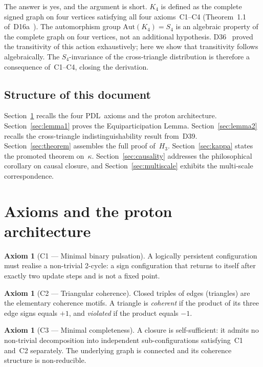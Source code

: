 \documentclass[11pt,a4paper]{article}
\theoremstyle{plain}
\theoremstyle{definition}
\newtheorem{axiom}[theorem]{Axiom}
\theoremstyle{remark}
\newcommand{\PDL}{\textnormal{PDL}}
\newcommand{\Kfour}{K_4}
\newcommand{\kap}{\kappa}
\begin{document}
The answer is yes, and the argument is short. $\Kfour$ is defined as the complete signed graph on four vertices satisfying all four axioms~C1--C4 (Theorem~1.1 of~D16a~\cite{PDL_D16a_2026}). The automorphism group $\mathrm{Aut}(\Kfour) = S_4$ is an algebraic property of the complete graph on four vertices, not an additional hypothesis. D36~\cite{PDL_D36_2026} proved the transitivity of this action exhaustively; here we show that transitivity follows algebraically. The $S_4$-invariance of the cross-triangle distribution is therefore a consequence of~C1--C4, closing the derivation.

\subsection{Structure of this document}

Section~\ref{sec:axioms} recalls the four \PDL\ axioms and the proton architecture. Section~\ref{sec:lemma1} proves the Equiparticipation Lemma. Section~\ref{sec:lemma2} recalls the cross-triangle indistinguishability result from~D39. Section~\ref{sec:theorem} assembles the full proof of~$H_3$. Section~\ref{sec:kappa} states the promoted theorem on~$\kap$. Section~\ref{sec:causality} addresses the philosophical corollary on causal closure, and Section~\ref{sec:multiscale} exhibits the multi-scale correspondence.

\section{Axioms and the proton architecture}
\label{sec:axioms}

\begin{axiom}[C1 --- Minimal binary pulsation]
A logically persistent configuration must realise a non-trivial 2-cycle: a sign configuration that returns to itself after exactly two update steps and is not a fixed point.
\end{axiom}

\begin{axiom}[C2 --- Triangular coherence]
Closed triples of edges (triangles) are the elementary coherence motifs. A triangle is \emph{coherent} if the product of its three edge signs equals $+1$, and \emph{violated} if the product equals $-1$.
\end{axiom}

\begin{axiom}[C3 --- Minimal completeness]
A closure is self-sufficient: it admits no non-trivial decomposition into independent sub-configurations satisfying~C1 and~C2 separately. The underlying graph is connected and its coherence structure is non-reducible.
\end{axiom}
\end{document}
